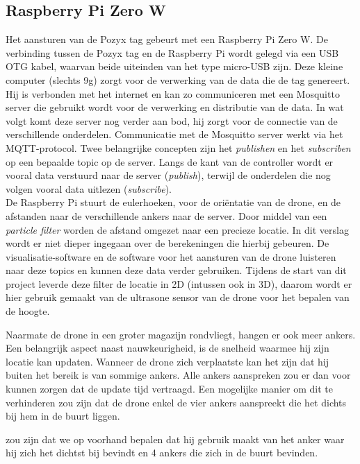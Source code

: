 \subsection{Raspberry Pi Zero W} \label{sec:zerow}
Het aansturen van de Pozyx tag gebeurt met een Raspberry Pi Zero W. De verbinding tussen de Pozyx tag en de Raspberry Pi wordt gelegd via een USB OTG kabel, waarvan beide uiteinden van het type micro-USB zijn. Deze kleine computer (slechts 9g) zorgt voor de verwerking van de data die de tag genereert. Hij is verbonden met het internet en kan zo communiceren met een Mosquitto server die gebruikt wordt voor de verwerking en distributie van de data. In wat volgt komt deze server nog verder aan bod, hij zorgt voor de connectie van de verschillende onderdelen. Communicatie met de Mosquitto server werkt via het MQTT-protocol. Twee belangrijke concepten zijn het \textit{publishen} en het \textit{subscriben} op een bepaalde topic op de server. Langs de kant van de controller wordt er vooral data verstuurd naar de server (\textit{publish}), terwijl de onderdelen die nog volgen vooral data uitlezen (\textit{subscribe}). \\

De Raspberry Pi stuurt de eulerhoeken, voor de ori\"entatie van de drone, en de afstanden naar de verschillende ankers naar de server. Door middel van een \textit{particle filter} worden de afstand omgezet naar een precieze locatie. In dit verslag wordt er niet dieper ingegaan over de berekeningen die hierbij gebeuren. De visualisatie-software en de software voor het aansturen van de drone luisteren naar deze topics en kunnen deze data verder gebruiken. Tijdens de start van dit project leverde deze filter de locatie in 2D (intussen ook in 3D), daarom wordt er hier gebruik gemaakt van de ultrasone sensor van de drone voor het bepalen van de hoogte.

Naarmate de drone in een groter magazijn rondvliegt, hangen er ook meer ankers. Een belangrijk aspect naast nauwkeurigheid, is de snelheid waarmee hij zijn locatie kan updaten. Wanneer de drone zich verplaatste kan het zijn dat hij buiten het bereik is van sommige ankers. Alle ankers aanspreken zou er dan voor kunnen zorgen dat de update tijd vertraagd. Een mogelijke manier om dit te verhinderen zou zijn dat de drone enkel de vier ankers aanspreekt die het dichts bij hem in de buurt liggen.

zou zijn dat we op voorhand bepalen dat hij gebruik maakt van het anker waar hij zich het dichtst bij bevindt en 4 ankers die zich in de buurt bevinden.

